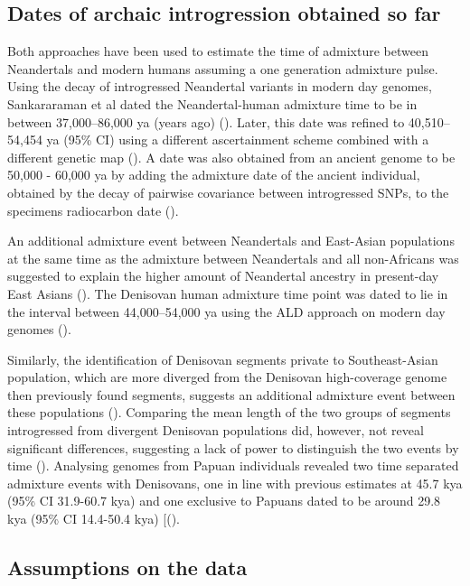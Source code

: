 \documentclass[]{article}
\begin{document}
\subsection{Dates of archaic introgression obtained so
far}\label{dates-of-archaic-introgression-obtained-so-far}

Both approaches have been used to estimate the time of admixture between
Neandertals and modern humans assuming a one generation admixture pulse.
Using the decay of introgressed Neandertal variants in modern day
genomes, Sankararaman et al dated the Neandertal-human admixture time to
be in between 37,000--86,000 ya (years ago) (\cite{sankararaman_date_2012}). Later,
this date was refined to 40,510--54,454 ya (95\% CI) using a different
ascertainment scheme combined with a different genetic map
(\cite{moorjani_genetic_2016}). A date was also obtained from an ancient
genome to be 50,000 - 60,000 ya by adding the admixture date of the
ancient individual, obtained by the decay of pairwise covariance between
introgressed SNPs, to the specimens radiocarbon date
(\cite{fu_genome_2014}).

An additional admixture event between Neandertals and East-Asian
populations at the same time as the admixture between Neandertals and
all non-Africans was suggested to explain the higher amount of
Neandertal ancestry in present-day East Asians
(\cite{kim_selection_2015,vernot_complex_2015}). The Denisovan human
admixture time point was dated to lie in the interval between 44,000--54,000 ya using the ALD
approach on modern day genomes (\cite{sankararaman_combined_2016}).

Similarly, the identification of Denisovan segments private to
Southeast-Asian population, which are more diverged from the Denisovan
high-coverage genome then previously found segments, suggests an
additional admixture event between these populations
(\cite{browning_analysis_2018}). Comparing the mean length of the two groups of segments introgressed
from divergent Denisovan populations did, however, not reveal
significant differences, suggesting a lack of power to distinguish the
two events by time (\cite{browning_analysis_2018,jacobs_multiple_2019}).
Analysing genomes from Papuan individuals revealed two time separated
admixture events with Denisovans, one in line with previous estimates at
45.7 kya (95\% CI 31.9-60.7 kya) and one exclusive to Papuans dated to
be around 29.8 kya (95\% CI 14.4-50.4 kya)
{[}(\cite{jacobs_multiple_2019}).

\subsection{Assumptions on the data}\label{assumptions-on-the-data}
\end{document}
